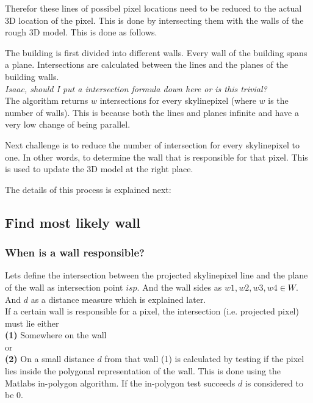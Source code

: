 \documentclass[10pt]{article}
\begin{document}
Therefor these lines of possibel pixel locations need to
be reduced to the actual 3D location of the pixel.  This is done by intersecting
them with the walls of the rough 3D model.  This is done as follows.

The building is first divided into different walls.  Every wall of the building spans a plane. 
Intersections are calculated between the lines and the planes of the building walls.\\
\textit{Isaac, should I put a intersection formula down here or is this trivial?}\\

The algorithm returns $w$ intersections for every skylinepixel (where $w$ is the number of walls).
This is because both the lines and planes infinite and have a very low change of
being parallel.

Next challenge is to reduce the number of intersection for every skylinepixel
to one. In other words, to determine the wall that is responsible for that pixel. 
This is used to update the 3D model at the right place.

The details of this process is explained next:

\subsection{Find most likely wall}
\subsubsection{When is a wall responsible?}
Lets define the intersection between the projected skylinepixel line and the
plane of the wall as intersection point $isp$. And the wall sides as ${w1, w2,
w3, w4 \in W}$. And $d$ as a distance measure which is explained later.\\ 
If a certain wall is responsible for a pixel, the intersection (i.e. projected
pixel) must lie either\\

\textbf{(1)} Somewhere on the wall 
\\
or
\\
\textbf{(2)} On a small distance $d$ from that wall
(1) is calculated by testing if the pixel lies inside the polygonal
representation of the wall. This is done using the Matlabs in-polygon
algorithm. If the in-polygon test succeeds $d$ is considered to be 0.\\
\end{document}
